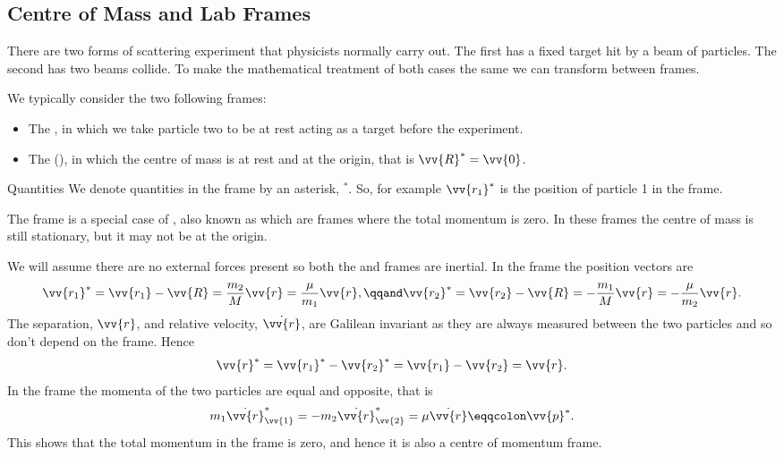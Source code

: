     \subsection{Centre of Mass and Lab Frames}
    There are two forms of scattering experiment that physicists normally carry out.
    The first has a fixed target hit by a beam of particles.
    The second has two beams collide.
    To make the mathematical treatment of both cases the same we can transform between frames.
    
    We typically consider the two following frames:
    \begin{itemize}
        \item The , in which we take particle two to be at rest acting as a target before the experiment.
        \item The  (\CM), in which the centre of mass is at rest and at the origin, that is \(\vv{R}^* = \vv{0}\).
    \end{itemize}
    
    \begin{ntn}{\CM{} Quantities}{}
        We denote quantities in the \CM{} frame by an asterisk, \(^*\).
        So, for example \(\vv{r_1}^*\) is the position of particle 1 in the \CM{} frame.
    \end{ntn}
    
    The \CM{} frame is a special case of , also known as  which are frames where the total momentum is zero.
    In these frames the centre of mass is still stationary, but it may not be at the origin.
    
    We will assume there are no external forces present so both the \LAB{} and \CM{} frames are inertial.
    In the \CM{} frame the position vectors are
    \begin{equation}
        \vv{r_1}^* = \vv{r_1} - \vv{R} = \frac{m_2}{M}\vv{r} = \frac{\mu}{m_1}\vv{r}, \qqand \vv{r_2}^* = \vv{r_2} - \vv{R} = -\frac{m_1}{M}\vv{r} = -\frac{\mu}{m_2}\vv{r}.
    \end{equation}
    The separation, \(\vv{r}\), and relative velocity, \(\dot{\vv{r}}\), are Galilean invariant as they are always measured between the two particles and so don't depend on the frame.
    Hence
    \begin{equation}
        \vv{r}^* = \vv{r_1}^* - \vv{r_2}^* = \vv{r_1} - \vv{r_2} = \vv{r}.
    \end{equation}
    In the \CM{} frame the momenta of the two particles are equal and opposite, that is
    \begin{equation}
        m_1\dot{\vv{r}}_{\vv{1}}^* = -m_2\dot{\vv{r}}_{\vv{2}}^* = \mu\dot{\vv{r}} \eqqcolon \vv{p}^*.
    \end{equation}
    This shows that the total momentum in the \CM{} frame is zero, and hence it is also a centre of momentum frame.
    
